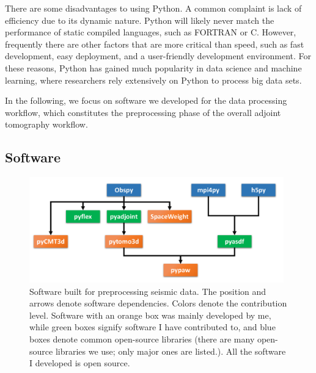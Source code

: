 There are some disadvantages to using Python.
A common complaint is lack of efficiency due to its dynamic nature.
Python will likely never match the performance of static compiled languages,
such as FORTRAN or C.
However,
frequently there are other factors that are more critical than speed,
such as fast development, easy deployment, and a user-friendly development environment.
For these reasons, Python has gained much popularity in data science and machine learning, where researchers rely extensively on Python to process big data sets.

In the following, we focus on software we developed
for the data processing workflow, which constitutes the preprocessing phase of the overall adjoint tomography workflow.

\subsection{Software}

\begin{figure}
  \centering
  \includegraphics[width=0.98\textwidth]{ch-tools/figures/data_processing_software.pdf}
  \caption[software built for preprocessing seismic data]
  {\small{Software built for preprocessing seismic data. The position and arrows denote software dependencies. Colors denote the contribution level. Software with
  an orange box was mainly developed by me, while green boxes signify software I have contributed to, and blue boxes denote common open-source libraries (there are many open-source libraries we use; only major ones are listed.). All the software I developed is open source.}}
  \label{fig:preprocess_software}
\end{figure}


